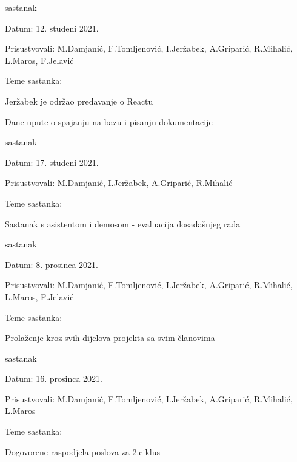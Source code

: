 \begin{packed_enum}
			\item  sastanak
			\item[] \begin{packed_item}
				\item Datum: 12. studeni 2021. 
				\item Prisustvovali: M.Damjanić, F.Tomljenović, I.Jeržabek, A.Griparić, R.Mihalić, L.Maros, F.Jelavić
				\item Teme sastanka:
				\begin{packed_item}
					\item  Jeržabek je održao predavanje o Reactu
					\item  Dane upute o spajanju na bazu i pisanju dokumentacije
				\end{packed_item}
			\end{packed_item}
			
			\eject
			\item  sastanak
			\item[] \begin{packed_item}
				\item Datum: 17. studeni 2021. 
				\item Prisustvovali: M.Damjanić, I.Jeržabek, A.Griparić, R.Mihalić
				\item Teme sastanka:
				\begin{packed_item}
					\item   Sastanak s asistentom i demosom - evaluacija dosadašnjeg rada
				\end{packed_item}
			\end{packed_item}
		
			\item  sastanak
			\item[] \begin{packed_item}
				\item Datum: 8. prosinca 2021. 
				\item Prisustvovali: M.Damjanić, F.Tomljenović, I.Jeržabek, A.Griparić, R.Mihalić, L.Maros, F.Jelavić
				\item Teme sastanka:
				\begin{packed_item}
					\item  Prolaženje kroz svih dijelova projekta sa svim članovima
				\end{packed_item}
			\end{packed_item}
		
			\item  sastanak
			\item[] \begin{packed_item}
				\item Datum: 16. prosinca 2021. 
				\item Prisustvovali: M.Damjanić, F.Tomljenović, I.Jeržabek, A.Griparić, R.Mihalić, L.Maros
				\item Teme sastanka:
				\begin{packed_item}
					\item  Dogovorene raspodjela poslova za 2.ciklus
				\end{packed_item}
			\end{packed_item}
		

\end{packed_enum}
